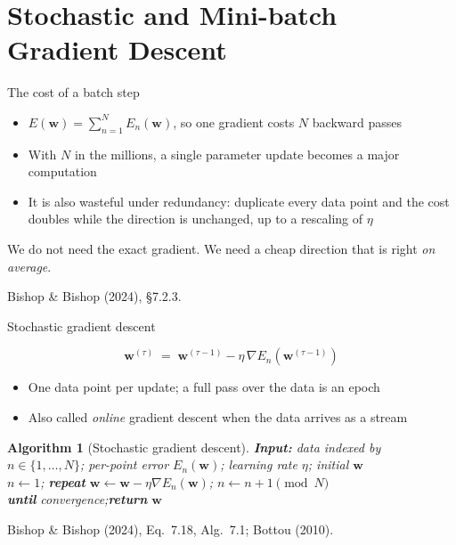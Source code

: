 \documentclass[aspectratio=169, 11pt]{beamer}
\newtheorem{algox}[theorem]{Algorithm}
\newcommand{\srcline}[1]{%
  \par\vspace{0.25em}%
  {\scriptsize\color{mcMuted}\hfill #1\par}}
\newcommand{\src}[3]{}      %
\begin{document}
\section{Stochastic and Mini-batch Gradient Descent}

\begin{frame}{The cost of a batch step}
  \src{bishop2024}{section}{7.2.3}
  \vspace{0.3em}
  \begin{itemize}\itemsep0.45em
    \item $E(\mathbf{w}) = \sum_{n=1}^{N} E_n(\mathbf{w})$, so one gradient costs $N$
          backward passes
    \item With $N$ in the millions, a single parameter update becomes a
          major computation
    \item It is also \alert{wasteful under redundancy}: duplicate every
          data point and the cost doubles while the direction is
          unchanged, up to a rescaling of $\eta$
  \end{itemize}
  \begin{redhighlight}
    We do not need the exact gradient. We need a cheap direction that is
    right \emph{on average}.
  \end{redhighlight}
  \srcline{Bishop \& Bishop (2024), \S7.2.3.}
\end{frame}

\begin{frame}{Stochastic gradient descent}
  \src{bishop2024}{equation}{7.18}
  \src{bishop2024}{algorithm}{7.1}
  \src{bishop2024}{section}{7.2.3}
  \src{bottou2010}{equation}{4}
  \src{bottou2010}{section}{2.2}
  \vspace{-0.3em}
  \[
    \mathbf{w}^{(\tau)} \;=\; \mathbf{w}^{(\tau-1)}
      - \eta\, \nabla E_n\!\left(\mathbf{w}^{(\tau-1)}\right)
  \]
  \vspace{-0.85em}
  \begin{itemize}\itemsep0.3em
    \item One data point per update; a full pass over the data is an
          \alert{epoch}
    \item Also called \emph{online} gradient descent when the data
          arrives as a stream
  \end{itemize}
  \vspace{0.35em}
  \begin{algox}[Stochastic gradient descent]\label{th:sgd}
    \small
    \textbf{Input:} data indexed by $n \in \{1,\dots,N\}$; per-point
    error $E_n(\mathbf{w})$; learning rate $\eta$; initial $\mathbf{w}$\\[0.25em]
    $n \leftarrow 1$;\quad
    \textbf{repeat}\quad
      $\mathbf{w} \leftarrow \mathbf{w} - \eta \nabla E_n(\mathbf{w})$;\quad
      $n \leftarrow n + 1 \pmod N$\\
    \textbf{until} convergence;\quad \textbf{return} $\mathbf{w}$
  \end{algox}
  \srcline{Bishop \& Bishop (2024), Eq.~7.18, Alg.~7.1; Bottou (2010).}
\end{frame}
\end{document}
